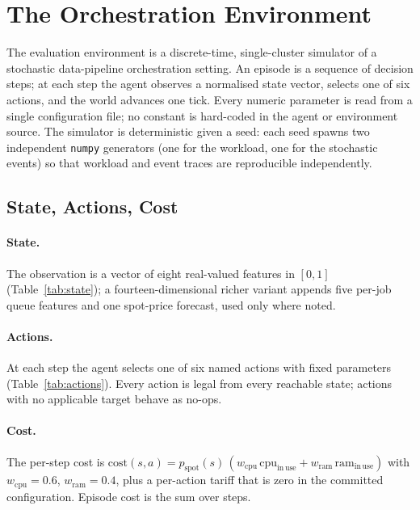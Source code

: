 \documentclass[10pt,twocolumn]{article}
\begin{document}
\section{The Orchestration Environment}
\label{sec:env}

The evaluation environment is a discrete-time, single-cluster simulator of a
stochastic data-pipeline orchestration setting. An episode is a sequence of
decision steps; at each step the agent observes a normalised state vector,
selects one of six actions, and the world advances one tick. Every numeric
parameter is read from a single configuration file; no constant is hard-coded in
the agent or environment source. The simulator is deterministic given a seed:
each seed spawns two independent \texttt{numpy} generators (one for the workload,
one for the stochastic events) so that workload and event traces are reproducible
independently.

\subsection{State, Actions, Cost}
\label{sec:state-actions}

\paragraph{State.} The observation is a vector of eight real-valued features in
$[0,1]$ (Table~\ref{tab:state}); a fourteen-dimensional richer variant appends
five per-job queue features and one spot-price forecast, used only where noted.

\paragraph{Actions.} At each step the agent selects one of six named actions with
fixed parameters (Table~\ref{tab:actions}). Every action is legal from every
reachable state; actions with no applicable target behave as no-ops.

\paragraph{Cost.} The per-step cost is
$\mathrm{cost}(s,a)=p_{\mathrm{spot}}(s)\,(w_{\mathrm{cpu}}\,\mathrm{cpu}_{\mathrm{in\,use}}+w_{\mathrm{ram}}\,\mathrm{ram}_{\mathrm{in\,use}})$
with $w_{\mathrm{cpu}}=0.6$, $w_{\mathrm{ram}}=0.4$, plus a per-action tariff that
is zero in the committed configuration. Episode cost is the sum over steps.
\end{document}
